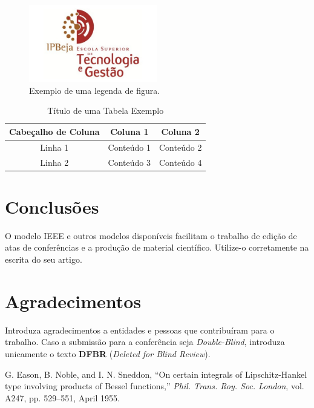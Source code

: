 \documentclass[conference]{IEEEtran}
\begin{document}
\begin{figure}[h!]
    \centering
    \includegraphics[width=0.5\textwidth]{IPBejaESTIG.jpg}
    \caption{Exemplo de uma legenda de figura.}
\end{figure}

\begin{table}[h!]
\caption{Título de uma Tabela Exemplo}
\centering
\begin{tabular}{|c|c|c|}
\hline
Cabeçalho de Coluna & Coluna 1 & Coluna 2 \\
\hline
Linha 1 & Conteúdo 1 & Conteúdo 2 \\
\hline
Linha 2 & Conteúdo 3 & Conteúdo 4 \\
\hline
\end{tabular}
\end{table}

\section{Conclusões}
O modelo IEEE e outros modelos disponíveis facilitam o trabalho de edição de atas de conferências e a produção de material científico. Utilize-o corretamente na escrita do seu artigo.

\section*{Agradecimentos}
Introduza agradecimentos a entidades e pessoas que contribuíram para o trabalho. Caso a submissão para a conferência seja \textit{Double-Blind}, introduza unicamente o texto \textbf{DFBR} (\textit{Deleted for Blind Review}).

\begin{thebibliography}{1}
 G. Eason, B. Noble, and I. N. Sneddon, “On certain integrals of Lipschitz-Hankel type involving products of Bessel functions,” \textit{Phil. Trans. Roy. Soc. London}, vol. A247, pp. 529–551, April 1955.
\end{thebibliography}
\end{document}
